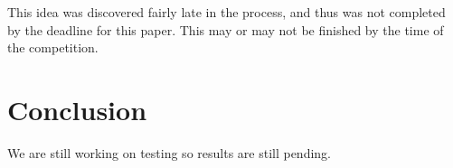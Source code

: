 \documentclass[10pt,twocolumn]{IEEEtran}
\begin{document}
This idea was discovered fairly late in the process, and thus was not completed by the deadline for this paper.
This may or may not be finished by the time of the competition.

\section{Conclusion} \label{sec:conclusion}
We are still working on testing so results are still pending.

\vspace{-0.08in}
\raggedright


\end{document}
